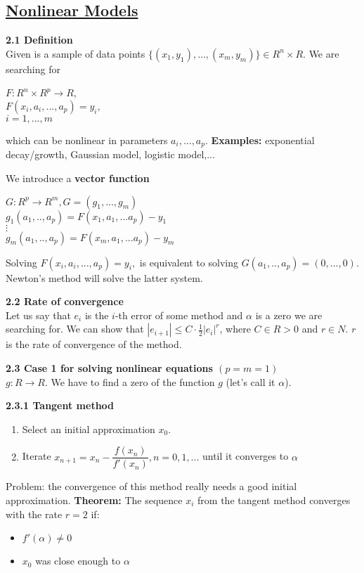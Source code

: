 \documentclass{article}
\begin{document}
\begin{multicols}{2}
\section{\underline{Nonlinear Models}}

\textbf{2.1 Definition}\\
Given is a sample of data points $\{(x_1, y_1), \dots ,(x_m, y_m)\} \in R^n \times R$.
We are searching for
\begin{center}
$F: R^n \times R^p \rightarrow R$, \\
$F(x_i, a_i, ..., a_p) = y_i,$ \\
$i = 1,...,m$
\end{center}
which can be nonlinear in parameters $a_i, \dots ,a_p$.
\textbf{Examples:} exponential decay/growth, Gaussian model, logistic model,...

We introduce a \textbf{vector function}
\begin{center}
$G: R^p \rightarrow R^m, G = (g_1,...,g_m)$\\
$g_1(a_1,..,a_p) = F(x_1,a_1,...a_p) - y_1$\\
$\vdots$\\
$g_m(a_1,..,a_p) = F(x_m,a_1,...a_p) - y_m$
\end{center}

Solving $F(x_i, a_i, ..., a_p) = y_i,$ is equivalent to solving $G(a_1,..,a_p) = (0,...,0)$. 
Newton's method will solve the latter system.

\textbf{2.2 Rate of convergence}\\
Let us say that $e_i$ is the $i$-th error of some method and $\alpha$ is
a zero we are searching for. We can show that $|e_{i+1}| \leq C \cdot \frac{1}{2}|e_i|^r$, where $C \in R>0$ and $r \in N$. $r$ is
the rate of convergence of the method.

\textbf{2.3 Case 1 for solving nonlinear equations  $(p = m = 1)$}\\
$g: R \rightarrow R$. We have to find a zero of the function $g$ (let's call it $\alpha$).

\textbf{2.3.1 Tangent method}
\begin{enumerate}
    \item Select an initial approximation $x_0$.
    \item Iterate $x_{n+1} = x_n - \dfrac{f(x_n)}{f'(x_n)}, n=0,1,...$ until it converges to $\alpha$
\end{enumerate}
Problem: the convergence of this method really needs a good initial approximation.
\textbf{Theorem:} The sequence $x_i$ from the tangent method converges with the rate
$r = 2$ if:
\begin{itemize}
  \item $f'(\alpha) \neq 0$
  \item $x_0$ was close enough to $\alpha$
\end{itemize}


\end{multicols}
\end{document}
